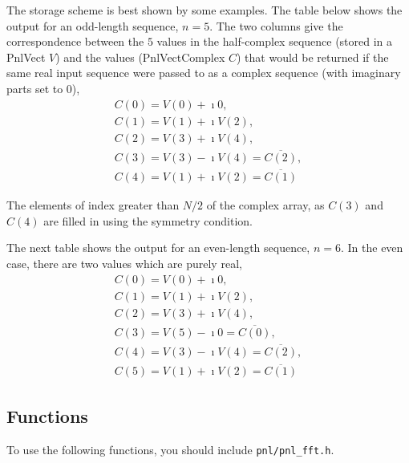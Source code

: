 The storage scheme is best shown by some examples. The table below shows the
output for an odd-length sequence, $n=5$.  The two columns give the
correspondence between the $5$ values in the half-complex sequence (stored in
a PnlVect $V$) and the values (PnlVectComplex $C$) that would be returned if
the same real input sequence were passed to  as a complex
sequence (with imaginary parts set to 0),
\begin{equation}
  \begin{array}{l}
    C(0) =  V(0) + \imath 0, \\
    C(1) =  V(1) + \imath V(2), \\
    C(2) =  V(3) + \imath V(4), \\
    C(3) = V(3) - \imath V(4)=  \overline{C(2)} , \\
    C(4) = V(1) + \imath V(2)=  \overline{C(1)}
  \end{array}
\end{equation}

The elements of index greater than $N/2$ of the complex array, as $C(3)$ and
$C(4)$ are filled in using the symmetry condition.

The next table shows the output for an even-length sequence, $n=6$.
In the even case, there are two values which are purely real,
\begin{equation}
  \begin{array}{l}
    C(0) =  V(0) + \imath 0, \\
    C(1) =  V(1) + \imath V(2), \\
    C(2) =  V(3) + \imath V(4), \\
    C(3) = V(5) - \imath 0    =  \overline{C(0)} , \\
    C(4) = V(3) - \imath V(4) =  \overline{C(2)} , \\
    C(5) = V(1) + \imath V(2) =  \overline{C(1)}
  \end{array}
\end{equation}


\subsection{Functions}

To use the following functions, you should include \verb!pnl/pnl_fft.h!.

